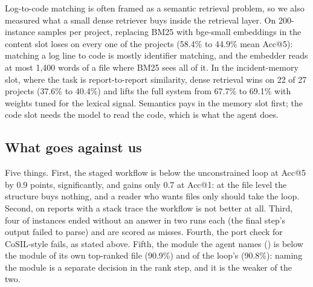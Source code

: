 Log-to-code matching is often framed as a semantic retrieval problem,
so we also measured what a small dense retriever buys inside the
retrieval layer. On
200-instance samples per project, replacing BM25 with bge-small
embeddings in the content slot loses on every one of the \nProjects{}
projects (58.4\% to 44.9\% mean Acc@5): matching a log line to code is
mostly identifier matching, and the embedder reads at most 1,400 words
of a file where BM25 sees all of it. In the incident-memory slot, where
the task is report-to-report similarity, dense retrieval wins on 22 of
27 projects (37.6\% to 40.4\%) and lifts the full system from 67.7\% to
69.1\% with weights tuned for the lexical signal. Semantics pays in the
memory slot first; the code slot needs the model to read the code, which
is what the agent does.

\subsection{What goes against us}
\label{sec:results:negatives}

Five things. First, the staged workflow is below the unconstrained loop at
Acc@5 by 0.9 points, significantly, and gains only 0.7 at Acc@1: at the
file level the structure buys nothing, and a reader who wants files only
should take the loop. Second, on reports with a stack trace the
workflow is not better at all. Third, four of \nEval{} instances
ended without an answer in two runs each (the final step's output
failed to parse) and are scored as misses. Fourth, the port check for CoSIL-style fails,
as stated above. Fifth, the module the agent names (\modOne{}) is below
the module of its own top-ranked file (90.9\%) and of the loop's
(90.8\%): naming the module is a separate decision in the rank step,
and it is the weaker of the two.
